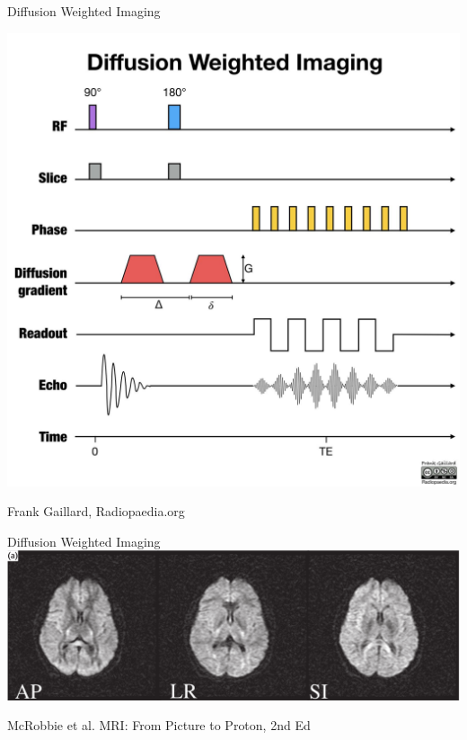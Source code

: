 \documentclass[aspectratio=169,xcolor=dvipsnames]{beamer}
\begin{document}

\begin{frame}{Diffusion Weighted Imaging}
\begin{center}
\includegraphics[width=.5\textwidth]{imgs/mri-physics-diagrams-1}

\tiny{Frank Gaillard, Radiopaedia.org}
\end{center}

\end{frame}


\begin{frame}{Diffusion Weighted Imaging}
\includegraphics[width=1\textwidth]{imgs/threedirectionsdiffusion}

\tiny{McRobbie et al. MRI: From Picture to Proton, 2nd Ed}
\end{frame}
\end{document}
